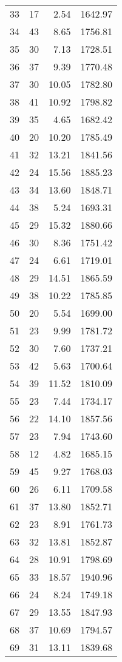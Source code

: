 \begin{appendix}
\begin{longtable}{rrrr}
33 & 17 & 2.54 & 1642.97 \\
34 & 43 & 8.65 & 1756.81 \\
35 & 30 & 7.13 & 1728.51 \\
36 & 37 & 9.39 & 1770.48 \\
37 & 30 & 10.05 & 1782.80 \\
38 & 41 & 10.92 & 1798.82 \\
39 & 35 & 4.65 & 1682.42 \\
40 & 20 & 10.20 & 1785.49 \\
41 & 32 & 13.21 & 1841.56 \\
42 & 24 & 15.56 & 1885.23 \\
43 & 34 & 13.60 & 1848.71 \\
44 & 38 & 5.24 & 1693.31 \\
45 & 29 & 15.32 & 1880.66 \\
46 & 30 & 8.36 & 1751.42 \\
47 & 24 & 6.61 & 1719.01 \\
48 & 29 & 14.51 & 1865.59 \\
49 & 38 & 10.22 & 1785.85 \\
50 & 20 & 5.54 & 1699.00 \\
51 & 23 & 9.99 & 1781.72 \\
52 & 30 & 7.60 & 1737.21 \\
53 & 42 & 5.63 & 1700.64 \\
54 & 39 & 11.52 & 1810.09 \\
55 & 23 & 7.44 & 1734.17 \\
56 & 22 & 14.10 & 1857.56 \\
57 & 23 & 7.94 & 1743.60 \\
58 & 12 & 4.82 & 1685.15 \\
59 & 45 & 9.27 & 1768.03 \\
60 & 26 & 6.11 & 1709.58 \\
61 & 37 & 13.80 & 1852.71 \\
62 & 23 & 8.91 & 1761.73 \\
63 & 32 & 13.81 & 1852.87 \\
64 & 28 & 10.91 & 1798.69 \\
65 & 33 & 18.57 & 1940.96 \\
66 & 24 & 8.24 & 1749.18 \\
67 & 29 & 13.55 & 1847.93 \\
68 & 37 & 10.69 & 1794.57 \\
69 & 31 & 13.11 & 1839.68 \\
\bottomrule
\end{longtable}

\end{appendix}
